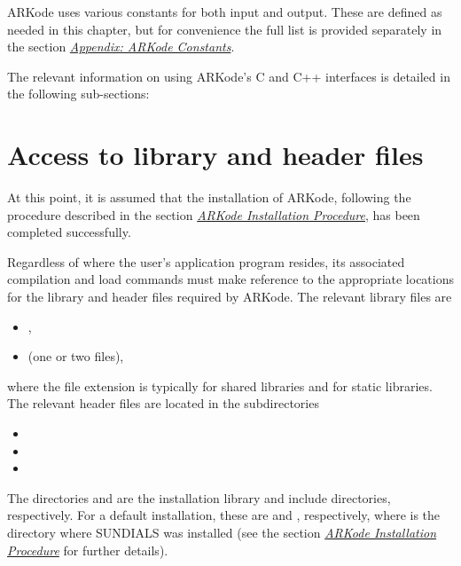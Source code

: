 \documentclass[letterpaper,10pt,english]{sphinxmanual}
\begin{document}
ARKode uses various constants for both input and output. These are
defined as needed in this chapter, but for convenience the full list
is provided separately in the section {\hyperref[Constants:constants]{\emph{Appendix: ARKode Constants}}}.

The relevant information on using ARKode's C and C++ interfaces is
detailed in the following sub-sections:


\section{Access to library and header files}
\label{c_interface/General:access-to-library-and-header-files}\label{c_interface/General:cinterface-headers}\label{c_interface/General::doc}
At this point, it is assumed that the installation of ARKode,
following the procedure described in the section {\hyperref[Install:installation]{\emph{ARKode Installation Procedure}}},
has been completed successfully.

Regardless of where the user's application program resides, its
associated compilation and load commands must make reference to the
appropriate locations for the library and header files required by
ARKode. The relevant library files are
\begin{itemize}
\item {} 
,

\item {} 
 (one or two files),

\end{itemize}

where the file extension  is typically  for shared
libraries and  for static libraries.  The relevant header files
are located in the subdirectories
\begin{itemize}
\item {} 

\item {} 

\item {} 

\end{itemize}

The directories  and  are the installation library
and include directories, respectively.  For a default installation,
these are  and , respectively, where
 is the directory where SUNDIALS was installed (see the
section {\hyperref[Install:installation]{\emph{ARKode Installation Procedure}}} for further details).
\end{document}
